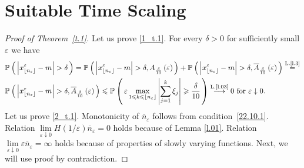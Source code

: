 \documentclass{article}
\theoremstyle{plain}
\theoremstyle{definition}
\theoremstyle{remark}
\newcommand{\p}[2][]{{\mathbb{P}}_{#1} \left( \, #2 \, \right) } %
\begin{document}
\section{Suitable Time Scaling}\label{sec_ap_3}
\begin{proof}[Proof of Theorem~\ref{t.1}]
Let us prove \ref{1_t.1}. For every $\delta > 0$ for sufficiently small $\varepsilon$ we have
    $$
    \begin{aligned}
        & \p{\left| x_{\lfloor n_\varepsilon \rfloor}^{\varepsilon} - m \right| > \delta} = \p{\left| x_{\lfloor n_\varepsilon \rfloor}^{\varepsilon} - m \right| > \delta, A_{\frac{\delta}{10}}\left(\varepsilon\right)} + \p{\left| x_{\lfloor n_\varepsilon \rfloor}^{\varepsilon} - m \right| > \delta, \overline{A}_{\frac{\delta}{10}}\left(\varepsilon\right)} \overset{\text{L.\ref{l.3}}}{=} \\
        & \p{\left| x_{\lfloor n_\varepsilon \rfloor}^{\varepsilon} - m \right| > \delta, \overline{A}_{\frac{\delta}{10}}\left(\varepsilon\right)} \leqslant \p{\varepsilon\max\limits_{1\leqslant k \leqslant \lfloor n_\varepsilon \rfloor}\left|\sum\limits_{j=1}^k\xi_j\right| \geqslant \frac{\delta}{10}} \overset{\text{L.\ref{l.03}}}{\longrightarrow} 0 \text{ for } \varepsilon \downarrow 0.
    \end{aligned}
    $$
Let us prove \ref{2_t.1}.
Monotonicity of $\overline{n}_\varepsilon$ follows from condition~\ref{22.10.1}. Relation $\lim\limits_{\varepsilon\downarrow 0}H\left(1/\varepsilon\right) \overline{n}_\varepsilon = 0$ holds because of Lemma \ref{l.01}. Relation $\lim\limits_{\varepsilon\downarrow 0}\varepsilon \overline{n}_\varepsilon=\infty$ holds because of properties of slowly varying functions. Next, we will use proof by contradiction.


\end{proof}
\end{document}
